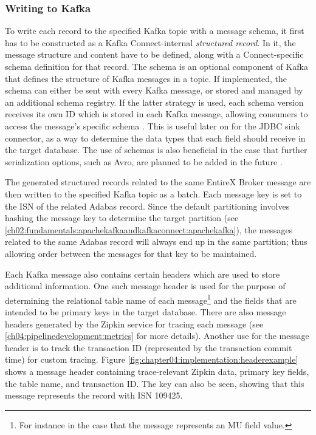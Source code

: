 \subsubsection{Writing to Kafka} 
To write each record to the specified Kafka topic with a message schema, it first has to be constructed as a Kafka Connect-internal \textit{structured record}. In it, the message structure and content have to be defined, along with a Connect-specific schema definition for that record. The schema is an optional component of Kafka that defines the structure of Kafka messages in a topic. If implemented, the schema can either be sent with every Kafka message, or stored and managed by an additional schema registry. If the latter strategy is used, each schema version receives its own ID which is stored in each Kafka message, allowing consumers to access the message's specific schema \cite{kafkadatabaseinverted}. This is useful later on for the \ac{JDBC} sink connector, as a way to determine the data types that each field should receive in the target database. The use of schemas is also beneficial in the case that further serialization options, such as Avro, are planned to be added in the future \cite{kreps2011kafka}.

The generated structured records related to the same EntireX Broker message are then written to the specified Kafka topic as a batch. Each message key is set to the \ac{ISN} of the related Adabas record. Since the default partitioning involves hashing the message key to determine the target partition (see \ref{ch02:fundamentals:apachekafkaandkafkaconnect:apachekafka}), the messages related to the same Adabas record will always end up in the same partition; thus allowing order between the messages for that key to be maintained.

Each Kafka message also contains certain headers which are used to store additional information. One such message header is used for the purpose of determining the relational table name of each message\footnote{For instance in the case that the message represents an MU field value.} and the fields that are intended to be primary keys in the target database. There are also message headers generated by the Zipkin service for tracing each message (see \ref{ch04:pipelinedevelopment:metrics} for more details). Another use for the message header is to track the transaction ID (represented by the transaction commit time) for custom tracing. Figure \ref{fig:chapter04:implementation:headerexample} shows a message header containing trace-relevant Zipkin data, primary key fields, the table name, and transaction ID. The key can also be seen, showing that this message represents the record with \ac{ISN} 109425.

